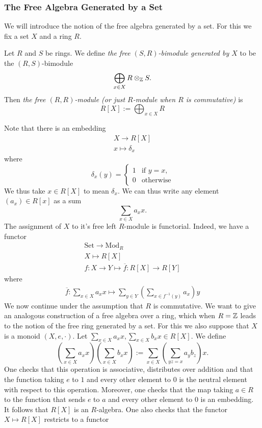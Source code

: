 \subsubsection{The Free Algebra Generated by a Set}
We will introduce the notion of the free algebra generated by a set. For this we fix a set $X$ and a ring $R$.
\begin{definition}
    Let $R$ and $S$ be rings. We define \emph{the free $(S,R)$-bimodule generated by $X$} to be the $(R,S)$-bimodule
    $$
        \bigoplus_{x\in X} R \otimes_{\mathbb{Z}} S.
    $$
    Then \emph{the free $(R,R)$-module (or just $R$-module when $R$ is commutative)} is 
    $$
        R[X]:=\bigoplus_{x\in X} R
    $$
\end{definition}   
Note that there is an embedding  
\begin{gather*}
    X \rightarrow R[X]\\
    x \mapsto \delta_{x}
\end{gather*}
where 
$$
    \delta_x(y) = 
    \begin{cases}
        1 & \text{if } y = x,\\
        0 & \text{otherwise}
    \end{cases}
$$
We thus take $x\in R[X]$ to mean $\delta_{x}$. We can thus write any element $(a_x)\in R[x]$ as a sum 
$$
    \sum_{x\in X} a_x x.
$$
The assignment of $X$ to it's free left $R$-module is functorial. Indeed, we have a functor
\begin{gather*}
    \mathrm{Set} \rightarrow \mathrm{Mod}_R\\
    X \mapsto R[X]\\
    f : X \rightarrow Y \mapsto \overline{f} : R[X]\rightarrow R[Y]
\end{gather*}
where 
\begin{gather*}
    \overline{f} : \sum_{x\in X} a_x x \mapsto \sum_{y\in Y} \left(\sum_{x \in f^{-1}(y)} a_x \right)y
\end{gather*}
We now continue under the assumption that $R$ is commutative. We want to give an analogous construction of a free algebra over a ring, which when $R=\mathbb{Z}$ leads to the notion of the free ring generated by a set. For this we also suppose that $X$ is a monoid $(X,e,\cdot)$. Let $\sum_{x\in X} a_x x,\sum_{x\in X} b_x x\in R[X]$. We define 
$$
    \left(\sum_{x\in X} a_x x\right)\left(\sum_{x\in X} b_x x\right) := \sum_{x\in X} \left(\sum_{yz =x} a_yb_z \right)x.
$$
One checks that this operation is associative, distributes over addition and that the function taking $e$ to $1$ and every other element to $0$ is the neutral element with respect to this operation. Moreover, one checks that the map taking $a\in R$ to the function that sends $e$ to $a$ and every other element to $0$ is an embedding. It follows that $R[X]$ is an $R$-algebra. One also checks that the functor $X\mapsto R[X]$ restricts to a functor 
